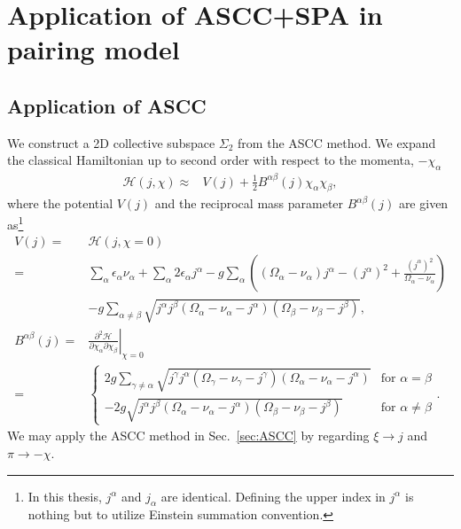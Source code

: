 \documentclass[11pt]{book} %
\begin{document}

\section{Application of ASCC+SPA in pairing model}
\label{4-2}

\subsection{Application of ASCC}

We construct a 2D collective subspace $\Sigma_2$ from the ASCC method.
We expand the classical Hamiltonian up to second order with respect to
the momenta, $-\chi_{\alpha}$
\begin{align}
  \mathcal{H}(j,\chi) \approx& V(j) + \frac{1}{2}B^{\alpha\beta}(j)\chi_{\alpha}\chi_{\beta},
\end{align}
where the potential $V(j)$ and the reciprocal mass parameter
$B^{\alpha\beta}(j)$ are given as\footnote{In this thesis, $j^{\alpha}$ and $j_{\alpha}$ are identical. Defining the upper index in $j^{\alpha}$ is nothing but to utilize Einstein summation convention.}
\begin{align}
  V(j) =& \mathcal{H}(j,\chi=0) \nonumber \\
  =& \sum_{\alpha} \epsilon_{\alpha}\nu_{\alpha} + \sum_{\alpha} 2\epsilon_{\alpha}j^{\alpha} - g\sum_{\alpha} \left( (\Omega_{\alpha}-\nu_{\alpha}) j^{\alpha} - (j^{\alpha})^2 +\frac{(j^{\alpha})^2}{\Omega_{\alpha}-\nu_{\alpha}} \right) \nonumber \\
	&- g\sum_{\alpha\ne \beta} \sqrt{j^{\alpha}j^{\beta}(\Omega_{\alpha}-\nu_{\alpha}-j^{\alpha})(\Omega_{\beta}-\nu_{\beta}-j^{\beta})}, \\
B^{\alpha\beta}(j) =& \left. \frac{\partial^2\mathcal{H}}{\partial\chi_{\alpha}\partial\chi_{\beta}} \right|_{\chi=0} \\
\label{mass}
=&
	\begin{cases}
2g\sum_{\gamma\ne \alpha} \sqrt{j^{\gamma}j^{\alpha}(\Omega_{\gamma}-\nu_{\gamma}-j^{\gamma})(\Omega_{\alpha}-\nu_{\alpha}-j^{\alpha})}
		& \text{for $\alpha=\beta$} \\
-2g\sqrt{j^{\alpha}j^{\beta}(\Omega_{\alpha}-\nu_{\alpha}-j^{\alpha})(\Omega_{\beta}-\nu_{\beta}-j^{\beta})}
		& \text{for $\alpha\ne\beta$}
	\end{cases}. \nonumber
\end{align}
We may apply the ASCC method in Sec.~\ref{sec:ASCC}
by regarding $\xi\to j$ and $\pi\to-\chi$.
\end{document}
